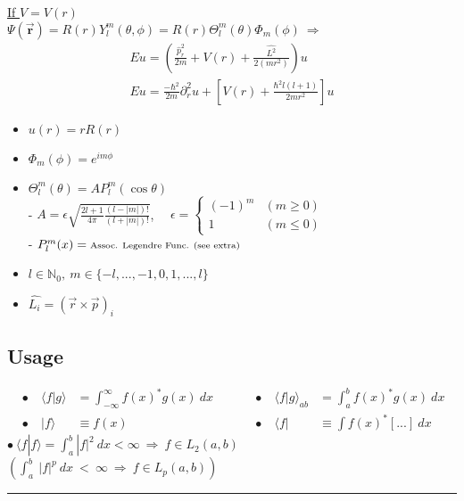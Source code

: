 \documentclass[12pt]{article}
\begin{document}
\begin{minipage}[t]{.5\textwidth}
    \underline{If \( V = V(r) \)}\\[10pt]
    \( \Psi(\vec{\mathbf{r}}) = R(r) Y^m_l(\theta, \phi) 
        = R(r) \Theta^m_l(\theta) \Phi_m(\phi) \ \Rightarrow \)
    \begin{gather*}
        E u = \left( \frac{\hat{p}_r^2}{2m} + V(r) + \frac{\hat{L^2}}{2(mr^2)} \right) u\\
        \boxed{ E u = \frac{-\hbar^2}{2m} \partial_r^2 u
            + \left[ V(r) + \frac{\hbar^2 l(l+1)}{2m r^2} \right] u }
    \end{gather*}
    \begin{itemize}
        \item \( u(r) = r R(r) \)
        \item \( \Phi_m(\phi) = e^{i m \phi}\)
        \item \( \Theta^m_l(\theta) = A P^m_l(\cos{\theta}) \)\\[5pt]
        - \( A = \epsilon \sqrt{ \frac{2l+1}{4\pi} \frac{(l-|m|)!}{(l+|m|)!} } \), \ \
            \( \epsilon = \begin{cases}
                \scriptstyle (-1)^m & \scriptstyle (m \geq 0) \\
                \scriptstyle1       & \scriptstyle (m \leq 0)
            \end{cases} \)\\[5pt]
        - \( P^m_l(x) = \text{\scriptsize{Assoc. Legendre Func. (see extra)}} \)
        \item \( l \in \mathbb{N}_0, \ m \in \{ -l, ..., -1, 0, 1, ..., l \} \)
        \item \( \widehat{L_i} = ( \vec{r} \times \vec{p} )_i \)
    \end{itemize}     
\end{minipage}

\newpage
\subsection{Usage}
\begin{center}
    \( \begin{aligned}
        &\bullet& \ \langle f|g \rangle &= \int_{-\infty}^{\infty} f(x)^* g(x) \ dx& \ \ \ \ \ \ \ \
            &\bullet& \ \langle f|g \rangle_{ab} &= \int_{a}^{b} f(x)^* g(x) \ dx\\[5pt]
        &\bullet& \ | f \rangle &\equiv f(x)&
            &\bullet& \ \langle f | &\equiv \int f(x)^* [...] \ dx
    \end{aligned}\) \\[15pt]
    \( \displaystyle \bullet \ \langle f|f \rangle = \int_{a}^{b} |f|^2 \ dx < \infty 
        \ \Rightarrow \ f \in L_2{\scriptstyle(a,b)} \) \ \ \ \ \ \ \ \ \
        \( \left( \int_{a}^{b} \ |f|^p \ {\scriptstyle dx \ < } \ \infty \ \Rightarrow \ f \in L_p{\scriptstyle(a,b)} \right) \)     
\end{center}
\rule[0pt]{1\textwidth}{.5pt}
\end{document}

